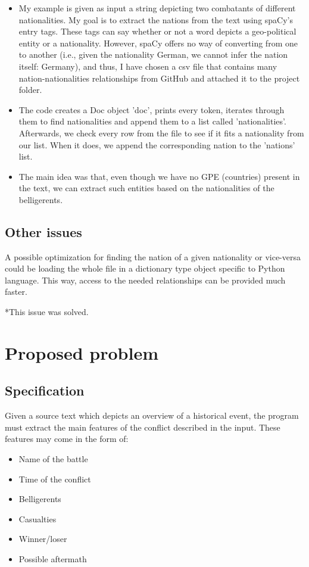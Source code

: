 \documentclass[a4paper,10pt]{article}
\begin{document}
\begin{itemize}
  
  \item My example is given as input a string depicting two combatants of different nationalities. My goal is to extract the nations from the text using spaCy's entry tags. These tags can say whether or not a word depicts a geo-political entity
  or a nationality. However, spaCy offers no way of converting from one to another (i.e., given the nationality German, we cannot infer the nation itself: Germany), and thus, I have chosen a csv file that contains many nation-nationalities relationships
  from GitHub and attached it to the project folder. 
  \item The code creates a Doc object 'doc', prints every token, iterates through them to find nationalities and append them to a list called 'nationalities'. Afterwards, we check every row from the file to see if it fits a nationality from our list. When it
  does, we append the corresponding nation to the 'nations' list. 
  \item The main idea was that, even though we have no GPE (countries) present in the text, we can extract such entities based on the nationalities of the belligerents.
   
\end{itemize}

    
 \subsection{Other issues}
  
  A possible optimization for finding the nation of a given nationality or vice-versa could be loading the whole file in a dictionary type object specific to Python language. This way, access to the needed relationships can be provided much faster. \newline
  
  *This issue was solved.
 
 \section{Proposed problem}
  \subsection{Specification} 
    
  \quad Given a source text which depicts an overview of a historical event, the program must extract the main features of the conflict described in the input. These features may come in the form of:
  \begin{itemize}
      \item Name of the battle
      \item Time of the conflict
      \item Belligerents
      \item Casualties
      \item Winner/loser
      \item Possible aftermath
  \end{itemize}
 
\end{document}
